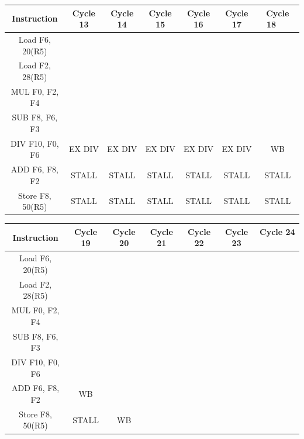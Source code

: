 \documentclass[a4paper, 11pt]{exam}
\begin{document}
\begin{enumerate}
\begin{enumerate}
\begin{center}
\begin{tabular}{ |c|c|c|c|c|c|c| } 
 \hline
  \textbf{Instruction} & \textbf{Cycle 13} & \textbf{Cycle 14} & \textbf{Cycle 15} & \textbf{Cycle 16} & \textbf{Cycle 17} & 
  \textbf{Cycle 18 \ \ } \\ 
  \hline
 Load F6, 20(R5) &  &  &  &  &  & \\ \hline
 Load F2, 28(R5) &  &  &  &  &  & \\ \hline
 MUL F0, F2, F4 &  &  &  &  &  & \\ \hline
 SUB F8, F6, F3 &  &  &  &  & & \\ \hline
 DIV F10, F0, F6 & EX DIV & EX DIV & EX DIV & EX DIV & EX DIV & WB\\ \hline
 ADD F6, F8, F2 & STALL & STALL & STALL & STALL & STALL & STALL\\ \hline
 Store F8, 50(R5) & STALL & STALL & STALL & STALL & STALL & STALL\\ \hline
\end{tabular}

\begin{tabular}{ |c|c|c|c|c|c|c| } 
 \hline
  \textbf{Instruction} & \textbf{Cycle 19} & \textbf{Cycle 20} & \textbf{Cycle 21} & \textbf{Cycle 22} & \textbf{Cycle 23} & 
  \textbf{Cycle 24 \ \ } \\ 
  \hline
 Load F6, 20(R5) &  &  &  &  &  & \\ \hline
 Load F2, 28(R5) &  &  &  &  &  & \\ \hline
 MUL F0, F2, F4 &  &  &  &  &  & \\ \hline
 SUB F8, F6, F3 &  &  &  &  &  & \\ \hline
 DIV F10, F0, F6 &  &  &  &  &  & \\ \hline
 ADD F6, F8, F2 & WB &  &  &  &  & \\ \hline
 Store F8, 50(R5) & STALL & WB &  &  &  & \\ \hline
\end{tabular}
\end{center}


\end{enumerate}


\end{enumerate}
\end{document}
